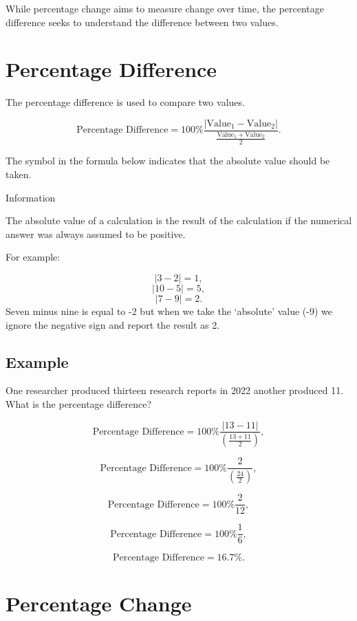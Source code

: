 \documentclass[
]{book}
\begin{document}
While percentage change aims to measure change over time, the percentage difference seeks to understand the difference between two values.

\hypertarget{percentage-difference}{%
\section{Percentage Difference}\label{percentage-difference}}

The percentage difference is used to compare two values.

\[ \textrm{Percentage Difference} = 100\% \frac{|\textrm{Value}_1 - \textrm{Value}_2|}{\frac{\textrm{Value}_1+\textrm{Value}_2}{2}}.\]

The \textbar{} symbol in the formula below indicates that the absolute value should be taken.

Information

The absolute value of a calculation is the result of the calculation if the numerical answer was always assumed to be positive.

For example:

\[ |3 - 2| = 1,\]
\[ |10 - 5| = 5,\]
\[ |7 - 9| = 2.\]
Seven minus nine is equal to -2 but when we take the `absolute' value (-9\textbar) we ignore the negative sign and report the result as 2.

\hypertarget{example-11}{%
\subsection{Example}\label{example-11}}

One researcher produced thirteen research reports in 2022 another produced 11. What is the percentage difference?

\[ \textrm{Percentage Difference} = 100\% \frac{|13 - 11|}{(\frac{13+11}{2})},\]

\[ \textrm{Percentage Difference} = 100\% \frac{2}{(\frac{24}{2})},\]

\[ \textrm{Percentage Difference} = 100\% \frac{2}{12},\]

\[ \textrm{Percentage Difference} = 100\% \frac{1}{6},\]

\[ \textrm{Percentage Difference} =16.7\%.\]

\hypertarget{percentage-change}{%
\section{Percentage Change}\label{percentage-change}}
\end{document}
